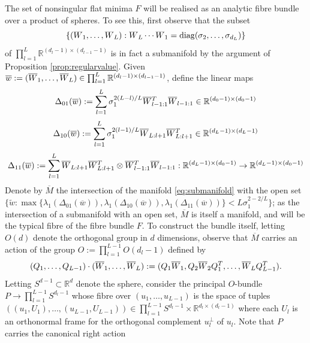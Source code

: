\documentclass{article}
\newcommand{\RB}{\mathbb{R}}
\newcommand{\tw}{\widetilde{w}}
\newcommand{\tW}{\widetilde{W}}
\newcommand{\bw}{\overline{w}}
\newcommand{\bW}{\smash{\overline{W}}\vphantom{W}}
\newcommand{\bM}{\overline{M}}
\theoremstyle{plain}
\theoremstyle{definition}
\theoremstyle{remark}
\begin{document}
The set of nonsingular flat minima $F$ will be realised as an analytic fibre bundle over a product of spheres. To see this, first observe that the subset
\begin{equation}\label{eq:submanifold}
\{(\bW_1,\dots,\bW_L):\bW_L\cdots \bW_1 = \mathrm{diag}(\sigma_2,\dots,\sigma_{d_L})\}
\end{equation}
of $\prod_{l=1}^L\RB^{(d_l-1)\times (d_{l-1}-1)}$ is in fact a submanifold by the argument of Proposition \ref{prop:regularvalue}. Given $\bw:=(\bW_1,\dots,\bW_L)\in\prod_{l=1}^L\RB^{(d_l-1)\times (d_{l-1}-1)}$, define the linear maps
\begin{align}
\Delta_{01}(\bw):=\sum_{l=1}^L\sigma_1^{2(L-l)/L}\bW^T_{l-1:1}\bW_{l-1:1}\in\RB^{(d_0-1)\times (d_0-1)}
\end{align}
\begin{align}
\Delta_{10}(\bw):=\sum_{l=1}^L\sigma_1^{2(l-1)/L}\bW_{L:l+1}\bW^T_{L:l+1}\in \RB^{(d_L-1)\times (d_L-1)}
\end{align}
\begin{align}
\Delta_{11}(\bw):=\sum_{l=1}^L\bW_{L:l+1}\bW_{L:l+1}^T\otimes \bW_{l-1:1}^T\bW_{l-1:1}:\RB^{(d_L-1)\times (d_0-1)}\rightarrow\RB^{(d_L-1)\times (d_0-1)}
\end{align}
Denote by $\bM$ the intersection of the manifold \eqref{eq:submanifold} with the open set $\{\tw:\max\{\lambda_1(\Delta_{01}(\bw)),\lambda_1(\Delta_{10}(\bw)),\lambda_1(\Delta_{11}(\bw))\}<L\sigma_1^{2-2/L}\}$; as the intersection of a submanifold with an open set, $\bM$ is itself a manifold, and will be the typical fibre of the fibre bundle $F$. To construct the bundle itself, letting $O(d)$ denote the orthogonal group in $d$ dimensions, observe that $\bM$ carries an action of the group $O:=\prod_{l=1}^{L-1}O(d_l-1)$ defined by
\begin{align}\label{eq:oaction}
(Q_1,\dots,Q_{L-1})\cdot(\bW_1,\dots,\bW_L):=(Q_1\bW_1,Q_2\bW_2Q_1^T,\dots,\bW_LQ_{L-1}^T).
\end{align}
Letting $S^{d-1}\subset\RB^d$ denote the sphere, consider the principal $O$-bundle $P\rightarrow \prod_{l=1}^{L-1}S^{d_l-1}$ whose fibre over $(u_1,\dots,u_{L-1})$ is the space of tuples $((u_1,U_1),\dots,(u_{L-1},U_{L-1}))\in \prod_{l=1}^{L-1}S^{d_{l}-1}\times\RB^{d_l\times(d_l-1)}$ where each $U_l$ is an orthonormal frame for the orthogonal complement $u_l^{\perp}$ of $u_l$. Note that $P$ carries the canonical right action
\end{document}

